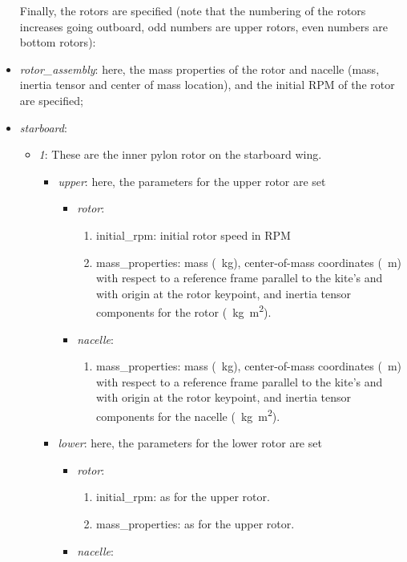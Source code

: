 \documentclass[report]{nrel}
\begin{document}
\begin{itemize}
Finally, the rotors are specified (note that the numbering of the rotors increases going outboard, odd numbers are upper rotors, even numbers are bottom rotors):
	\item \emph{rotor\_assembly}: here, the mass properties of the rotor and nacelle (mass, inertia tensor and center of mass location), and the initial RPM of the rotor are specified; 
	\item \emph{starboard}:
\begin{itemize}
	\item \emph{1}:	These are the inner pylon rotor on the starboard wing.
	\begin{itemize}
		\item \emph{upper}: here, the parameters for the upper rotor are set
		\begin{itemize}
			\item \emph{rotor}:
				\begin{enumerate}
					\item {initial\_rpm}: initial rotor speed in RPM
					\item {mass\_properties}: mass (\SI{}{\kg}), center-of-mass coordinates (\SI{}{\m}) with respect to a reference frame parallel to the kite's and with origin at the rotor keypoint, and inertia tensor components for the rotor (\SI{}{\kg\m\squared}). 
				\end{enumerate}
			\item \emph{nacelle}:
				\begin{enumerate}
				\item {mass\_properties}:  mass (\SI{}{\kg}), center-of-mass coordinates (\SI{}{\m}) with respect to a reference frame parallel to the kite's and with origin at the rotor keypoint, and inertia tensor components for the nacelle (\SI{}{\kg\m\squared}).  
				\end{enumerate}
 	\end{itemize}
		\item \emph{lower}: here, the parameters for the lower rotor are set
			\begin{itemize}
				\item \emph{rotor}:
				\begin{enumerate}
					\item {initial\_rpm}: as for the upper rotor.
					\item {mass\_properties}: as for the upper rotor. 
				\end{enumerate}
				\item \emph{nacelle}:
				\begin{enumerate}

\end{enumerate}
\end{itemize}
\end{itemize}
\end{itemize}
\end{itemize}
\end{document}
